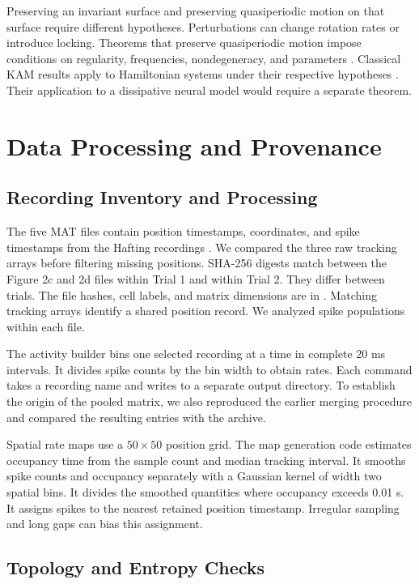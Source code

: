\documentclass[12pt,a4paper]{article}
\begin{document}
Preserving an invariant surface and preserving quasiperiodic motion on that surface require different hypotheses. Perturbations can change rotation rates or introduce locking. Theorems that preserve quasiperiodic motion impose conditions on regularity, frequencies, nondegeneracy, and parameters \cite{Broer1996}. Classical KAM results apply to Hamiltonian systems under their respective hypotheses \cite{Kolmogorov1954,Arnold1963,Moser1962}. Their application to a dissipative neural model would require a separate theorem.

\section{Data Processing and Provenance}\label{app:data}

\subsection{Recording Inventory and Processing}

The five MAT files contain position timestamps, coordinates, and spike timestamps from the Hafting recordings \cite{Hafting2005,HaftingData2017}. We compared the three raw tracking arrays before filtering missing positions. SHA-256 digests match between the Figure 2c and 2d files within Trial 1 and within Trial 2. They differ between trials. The file hashes, cell labels, and matrix dimensions are in . Matching tracking arrays identify a shared position record. We analyzed spike populations within each file.

The activity builder bins one selected recording at a time in complete 20 ms intervals. It divides spike counts by the bin width to obtain rates. Each command takes a recording name and writes to a separate output directory. To establish the origin of the pooled matrix, we also reproduced the earlier merging procedure and compared the resulting entries with the archive.

Spatial rate maps use a $50\times50$ position grid. The map generation code estimates occupancy time from the sample count and median tracking interval. It smooths spike counts and occupancy separately with a Gaussian kernel of width two spatial bins. It divides the smoothed quantities where occupancy exceeds 0.01 s. It assigns spikes to the nearest retained position timestamp. Irregular sampling and long gaps can bias this assignment.

\subsection{Topology and Entropy Checks}
\end{document}
